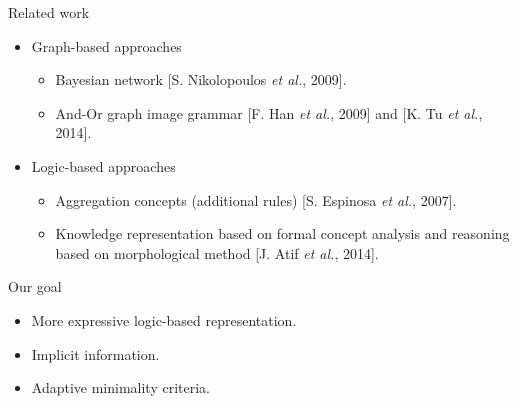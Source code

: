 \documentclass{beamer}
\begin{document}
\begin{frame}{Related work}

 \begin{itemize}
  \item Graph-based approaches
  \begin{itemize}
   \item Bayesian network [S. Nikolopoulos \textit{et al.}, 2009].
   \item And-Or graph image grammar [F. Han \textit{et al.}, 2009] and [K. Tu \textit{et al.}, 2014].
  \end{itemize}
  \item Logic-based approaches
  \begin{itemize}
   \item Aggregation concepts (additional rules) [S. Espinosa \textit{et al.}, 2007].
   \item Knowledge representation based on formal concept analysis and reasoning based on morphological method [J. Atif \textit{et al.}, 2014].
  \end{itemize}
 \end{itemize}
 
 \begin{alertblock}{Our goal}
   \begin{itemize}
    \item More expressive logic-based representation.
    \item Implicit information.
    \item Adaptive minimality criteria.
   \end{itemize}
 \end{alertblock}

\end{frame}
\end{document}

